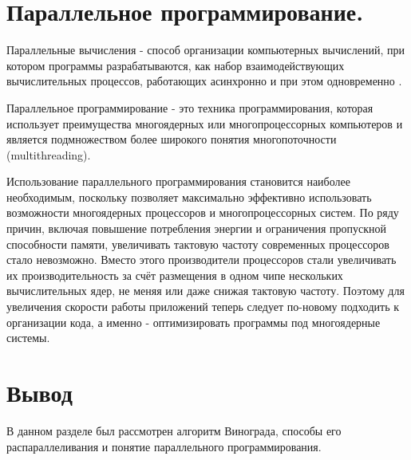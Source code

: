 \section{Параллельное программирование.}
Параллельные вычисления - способ организации компьютерных вычислений, при котором программы разрабатываются, как набор взаимодействующих вычислительных процессов, работающих асинхронно и при этом одновременно \cite{Parallel}.

Параллельное программирование - это техника программирования, которая использует преимущества многоядерных или многопроцессорных компьютеров и является подмножеством более широкого понятия многопоточности (multithreading).

Использование параллельного программирования становится наиболее необходимым, поскольку позволяет максимально эффективно использовать возможности многоядерных процессоров и многопроцессорных систем. По ряду причин, включая повышение потребления энергии и ограничения пропускной способности памяти, увеличивать тактовую частоту современных процессоров стало невозможно. Вместо этого производители процессоров стали увеличивать их производительность за счёт размещения в одном чипе нескольких вычислительных ядер, не меняя или даже снижая тактовую частоту. Поэтому для увеличения скорости работы приложений теперь следует по-новому подходить к организации кода, а именно - оптимизировать программы под многоядерные системы.

\section{Вывод}
В данном разделе был рассмотрен алгоритм Винограда, способы его распараллеливания и понятие параллельного программирования.